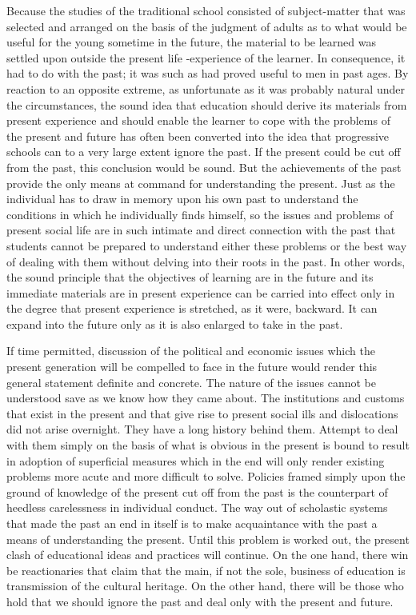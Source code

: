 Because the studies of the traditional school consisted of subject-matter that was 
selected and arranged on the basis of the judgment of adults as to what would be useful 
for the young sometime in the future, the material to be learned was settled upon outside 
the present life -experience of the learner. In consequence, it had to do with the past; it 
was such as had proved useful to men in past ages. By reaction to an opposite extreme, as 
unfortunate as it was probably natural under the circumstances, the sound idea that 
education should derive its materials from present experience and should enable the 
learner to cope with the problems of the present and future has often been converted into 
the idea that progressive schools can to a very large extent ignore the past. If the present 
could be cut off from the past, this conclusion would be sound. But the achievements of 
the past provide the only means at command for understanding the present. Just as the 
individual has to draw in memory upon his own past to understand the conditions in 
which he individually finds himself, so the issues and problems of present social life are 
in such intimate and direct connection with the past that students cannot be prepared to 
understand either these problems or the best way of dealing with them without delving 
into their roots in the past. In other words, the sound principle that the objectives of 
learning are in the future and its immediate materials are in present experience can be 
carried into effect only in the degree that present experience is stretched, as it were, 
backward. It can expand into the future only as it is also enlarged to take in the past. 

If time permitted, discussion of the political and economic issues which the present 
generation will be compelled to face in the future would render this general statement 
definite and concrete. The nature of the issues cannot be understood save as we know 
how they came about. The institutions and customs that exist in the present and that give 
rise to present social ills and dislocations did not arise overnight. They have a long 
history behind them. Attempt to deal with them simply on the basis of what is obvious in 
the present is bound to result in adoption of superficial measures which in the end will 
only render existing problems more acute and more difficult to solve. Policies framed 
simply upon the ground of knowledge of the present cut off from the past is the 
counterpart of heedless carelessness in individual conduct. The way out of scholastic 
systems that made the past an end in itself is to make acquaintance with the past a means 
of understanding the present. Until this problem is worked out, the present clash of 
educational ideas and practices will continue. On the one hand, there win be reactionaries 
that claim that the main, if not the sole, business of education is transmission of the 
cultural heritage. On the other hand, there will be those who hold that we should ignore 
the past and deal only with the present and future. 



